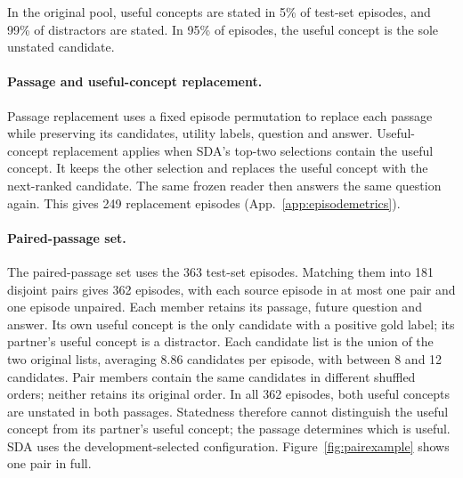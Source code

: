 In the original pool, useful concepts are stated in 5\% of test-set episodes, and 99\% of distractors are stated. In 95\% of episodes, the useful concept is the sole unstated candidate.

\paragraph{Passage and useful-concept replacement.}
Passage replacement uses a fixed episode permutation to replace each passage while preserving its candidates, utility labels, question and answer. Useful-concept replacement applies when SDA's top-two selections contain the useful concept. It keeps the other selection and replaces the useful concept with the next-ranked candidate. The same frozen reader then answers the same question again. This gives 249 replacement episodes (App.~\ref{app:episodemetrics}).

\paragraph{Paired-passage set.}
\label{app:pairedpassage}
The paired-passage set uses the 363 test-set episodes. Matching them into 181 disjoint pairs gives 362 episodes, with each source episode in at most one pair and one episode unpaired. Each member retains its passage, future question and answer. Its own useful concept is the only candidate with a positive gold label; its partner's useful concept is a distractor. Each candidate list is the union of the two original lists, averaging 8.86 candidates per episode, with between 8 and 12 candidates. Pair members contain the same candidates in different shuffled orders; neither retains its original order. In all 362 episodes, both useful concepts are unstated in both passages. Statedness therefore cannot distinguish the useful concept from its partner's useful concept; the passage determines which is useful. SDA uses the development-selected configuration. Figure~\ref{fig:pairexample} shows one pair in full.

